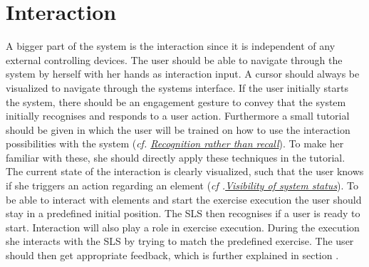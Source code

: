 \section{Interaction}\label{4_2_interaction}
A bigger part of the system is the interaction since it is independent of any external controlling devices.
The user should be able to navigate through the system by herself with her hands as interaction input.
A cursor should always be visualized to navigate through the systems interface.
If the user initially starts the system, there should be an engagement gesture to convey that the system initially recognises and responds to a user action.
Furthermore a small tutorial should be given in which the user will be trained on how to use the interaction possibilities with the system (\textit{cf. \hyperref[nielsenDesignPrinciples]{Recognition rather than recall}}).
To make her familiar with these, she should directly apply these techniques in the tutorial.
The current state of the interaction is clearly visualized, such that the user knows if she triggers an action regarding an element (\textit{cf .\hyperref[nielsenDesignPrinciples]{Visibility of system status}}).
To be able to interact with elements and start the exercise execution the user should stay in a predefined initial position.
The SLS then recognises if a user is ready to start. Interaction will also play a role in exercise execution.
During the execution she interacts with the SLS by trying to match the predefined exercise.
The user should then get appropriate feedback, which is further explained in section \textit{}.

\begin{comment}
- user can and should interact with the system
\\- Cursor visualization as hand image
\\- Engagement gesture for first interaction with Kinect (One hand over shoulder)
\\- She should be instructed how to interact 
\\- Different interaction methods should be provided to prevent failing on one (tutorial --> clicking (variations) + scrolling)
\end{comment}